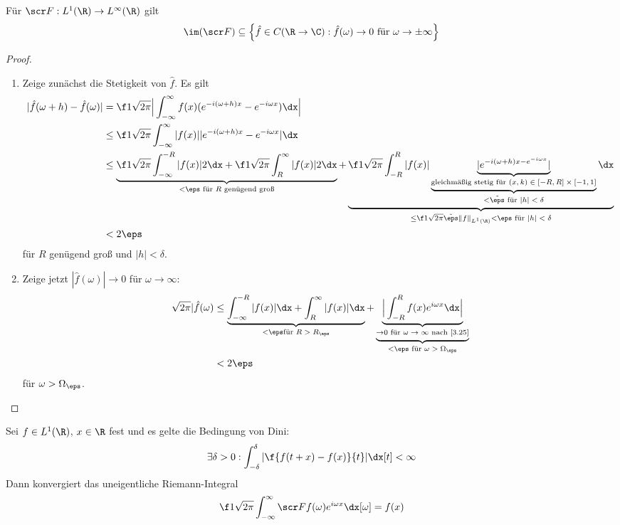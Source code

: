 \begin{st} \label{4.25}
	Für $\scr F: L^1(\R) \to L^\infty(\R)$ gilt
	\[
		\im (\scr F) \subset \Big\{ \hat f \in C(\R \to \C) : \hat f(\omega) \to 0 \text{ für } \omega \to \pm \infty \Big\}
	\]
	\begin{proof}
		\begin{enumerate}[1)]
			\item
				Zeige zunächst die Stetigkeit von $\hat f$.
				Es gilt
				\begin{align*}
					| \hat f(\omega + h) - \hat f(\omega) |
					&= \f 1{\sqrt{2\pi}} \Big| \int_{-\infty}^\infty f(x) ( e^{-i(\omega + h)x} - e^{-i \omega x} ) \dx \Big| \\
					&\le \f 1{\sqrt{2\pi}} \int_{-\infty}^\infty |f(x)| | e^{-i(\omega + h)x} - e^{-i \omega x} | \dx \\
					&\le \underbrace{\f 1{\sqrt{2\pi}} \int_{-\infty}^{-R} |f(x)| 2 \dx 
						+ \f 1{\sqrt{2\pi}} \int_{R}^{\infty} |f(x)| 2 \dx}_{< \eps \text{ für $R$ genügend groß}}
						+ \underbrace{\f 1{\sqrt{2\pi}} \int_{-R}^{R} |f(x)| \underbrace{\underbrace{|e^{-i(\omega + h) x - e^{-i \omega x}}|}_{\text{gleichmäßig stetig für $(x,k) \in [-R,R] \times [-1,1]$}}}_{< \tilde \eps \text{ für $|h|<\delta$}} \dx}_{\le \f 1{\sqrt{2\pi}} \tilde \eps \|f\|_{L^1(\R)} < \eps \text{ für $|h|<\delta$}} \\
					&< 2\eps
				\end{align*}
				für $R$ genügend groß und $|h| < \delta$.
			\item
				Zeige jetzt $|\hat f(\omega)| \to 0$ für $\omega \to \infty$:
				\begin{align*}
					\sqrt{2\pi} |\hat f(\omega) 
					&\le  \underbrace{\int_{-\infty}^{-R} |f(x)| \dx + \int_{R}^{\infty} |f(x)| \dx}_{<\eps \text{für $R > R_\eps$}}
					+ \underbrace{\underbrace{\Big| \int_{-R}^R f(x) e^{i\omega x} \dx \Big|}_{\to 0 \text{ für $\omega \to \infty$ nach \ref{3.25}}}}_{<\eps \text{ für $\omega > \Omega_\eps$}} \\
					&< 2\eps
				\end{align*}
				für $\omega > \Omega_\eps$.
		\end{enumerate}
	\end{proof}
\end{st}

\begin{st} \label{4.26}
	Sei $f \in L^1(\R)$, $x \in \R$ fest und es gelte die Bedingung von Dini:
	\[
		\exists \delta > 0 : \int_{-\delta}^{\delta} | \f {f(t+x)-f(x)}{t} | \dx[t] < \infty
	\]
	Dann konvergiert das uneigentliche Riemann-Integral
	\[
		\f 1{\sqrt{2\pi}} \int_{-\infty}^\infty \scr F f(\omega) e^{i \omega x} \dx[\omega] = f(x)
	\]
\end{st}


